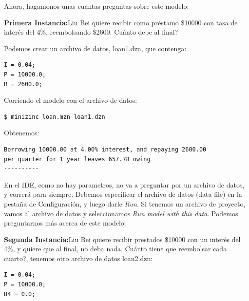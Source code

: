 \documentclass[12pt]{article}
\begin{document}
\begin{justify}
Ahora, hagamonos unas cuantas preguntas sobre este modelo:
\end{justify}

\begin{justify}
\textbf{Primera Instancia:}Liu Bei quiere recibir como préstamo \$10000 con tasa de interés del 4\%, reembolsando \$2600. Cuánto debe al final?
\end{justify}

\begin{justify}
Podemos crear un archivo de datos, loan1.dzn, que contenga:
\end{justify}

\begin{Verbatim}
I = 0.04;
P = 10000.0;
R = 2600.0;
\end{Verbatim}

\begin{justify}
Corriendo el modelo con el archivo de datos:
\end{justify}

\begin{Verbatim}
$ minizinc loan.mzn loan1.dzn
\end{Verbatim}

\begin{justify}
Obtenemos:
\end{justify}

\begin{Verbatim}
Borrowing 10000.00 at 4.00% interest, and repaying 2600.00
per quarter for 1 year leaves 657.78 owing
----------
\end{Verbatim}

\begin{justify}
En el IDE, como no hay parametros, no va a preguntar por un archivo de datos, y correrá para siempre. Debemos especificar el archivo de datos (data file) en la pestaña de Configuración, y luego darle \textit{Run}. Si tenemos un archivo de proyecto, vamos al archivo de datos y seleccionamos \textit{Run model with this data}. Podemos preguntarnos más acerca de este modelo:
\end{justify}

\begin{justify}
\textbf{Segunda Instancia:}Liu Bei quiere recibir prestados \$10000 con un interés del 4\%, y quiere que al final, no deba nada. Cuánto tiene que reembolsar cada cuarto?, tenemos otro archivo de datos loan2.dzn:
\end{justify}

\begin{Verbatim}
I = 0.04;
P = 10000.0;
B4 = 0.0;
\end{Verbatim}
\end{document}
